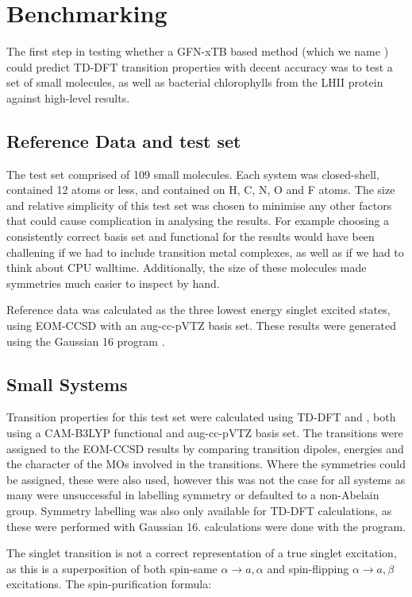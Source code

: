 \section{Benchmarking}
\label{sec:benchmarking}
The first step in testing whether a GFN-xTB based \dscf method (which we
name \dxtb) could predict TD-DFT transition properties with decent accuracy was
to test a set of small molecules, as well as bacterial chlorophylls
from the LHII protein against high-level results.

\subsection{Reference Data and test set}
\label{subsec:reference_data}
The test set comprised of 109 small molecules. Each system was closed-shell, 
contained 12 atoms or less, and contained on H, C, N, O and F atoms. The size and
relative simplicity of this test set was chosen to minimise any other factors that
could cause complication in analysing the results. For example choosing a consistently
correct basis set and functional for the \dscf results would have been challening 
if we had to include transition metal complexes, as well as if we had to think 
about CPU walltime. Additionally, the size of these molecules made symmetries
much easier to inspect by hand.

Reference data was calculated as the three lowest energy singlet excited states, 
using EOM-CCSD with an aug-cc-pVTZ basis set. These results were generated
using the Gaussian 16 program \cite{Gaussian16}.

\subsection{Small Systems}
\label{subsec:smalltest}
Transition properties for this test set were calculated using TD-DFT and \dscf,
both using a CAM-B3LYP functional and aug-cc-pVTZ basis set. The transitions were
assigned to the EOM-CCSD results by comparing transition dipoles, energies and 
the character of the MOs involved in the transitions. Where the symmetries could
be assigned, these were also used, however this was not the case for all systems
as many were unsuccessful in labelling symmetry or defaulted to a non-Abelain group.
Symmetry labelling was also only available for TD-DFT calculations, as these were
performed with Gaussian 16. \dscf calculations were done with the 
program.

The \dscf singlet transition is not a correct representation of a 
true singlet excitation, as this is a superposition of both spin-same
 $\alpha \rightarrow a, \alpha$ and spin-flipping $\alpha \rightarrow a, \beta$
excitations. The spin-purification formula:


